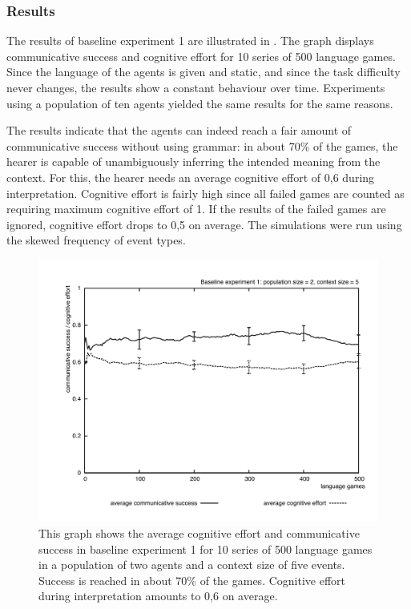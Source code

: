\subsubsection{Results}
 The results of baseline experiment 1 are illustrated in . The graph displays communicative success and cognitive effort for 10 series of 500 language games. Since the language of the agents is given and static, and since the task difficulty never changes, the results show a constant behaviour over time. Experiments using a population of ten agents yielded the same results for the same reasons.

The results indicate that the agents can indeed reach a fair amount of communicative success without using grammar: in about 70\% of the games, the hearer is capable of unambiguously inferring the intended meaning from the context. For this, the hearer needs an average cognitive effort of 0,6 during interpretation. Cognitive effort is fairly high since all failed games are counted as requiring maximum cognitive effort of 1. If the results of the failed games are ignored, cognitive effort drops to 0,5 on average. The simulations were run using the skewed frequency of event types.

\begin{figure}[htb]
\centerline{\includegraphics[width=\textwidth]{Chapter3/figs/graph-base1-effort2}}
  \caption[Baseline experiment 1: success and effort]{This graph shows the average cognitive effort and communicative success in baseline experiment 1 for 10 series of 500 language games in a population of two agents and a context size of five events. Success is reached in about 70\% of the games. Cognitive effort during interpretation amounts to 0,6 on average.}
   \label{f:base1-effort2}
\end{figure}


